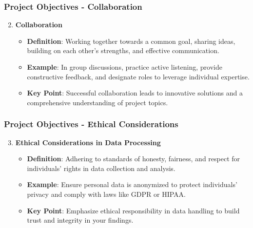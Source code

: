 \documentclass[aspectratio=169]{beamer}
\begin{document}
\begin{frame}[fragile]
    \frametitle{Project Objectives - Collaboration}
    \begin{enumerate}
        \setcounter{enumi}{1} %
        \item \textbf{Collaboration}
        \begin{itemize}
            \item \textbf{Definition}: Working together towards a common goal, sharing ideas, building on each other’s strengths, and effective communication.
            \item \textbf{Example}: In group discussions, practice active listening, provide constructive feedback, and designate roles to leverage individual expertise.
            \item \textbf{Key Point}: Successful collaboration leads to innovative solutions and a comprehensive understanding of project topics.
        \end{itemize}
    \end{enumerate}
\end{frame}

\begin{frame}[fragile]
    \frametitle{Project Objectives - Ethical Considerations}
    \begin{enumerate}
        \setcounter{enumi}{2} %
        \item \textbf{Ethical Considerations in Data Processing}
        \begin{itemize}
            \item \textbf{Definition}: Adhering to standards of honesty, fairness, and respect for individuals' rights in data collection and analysis.
            \item \textbf{Example}: Ensure personal data is anonymized to protect individuals' privacy and comply with laws like GDPR or HIPAA.
            \item \textbf{Key Point}: Emphasize ethical responsibility in data handling to build trust and integrity in your findings.
        \end{itemize}
    \end{enumerate}
\end{frame}
\end{document}
